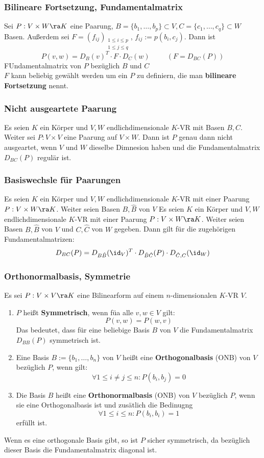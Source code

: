 \documentclass{kit}
\begin{document}
    \subsubsection{Bilineare Fortsetzung, Fundamentalmatrix}
      Sei $P:V\times W\ra K$ eine Paarung, $B=\{b_1,\dots,b_p\}\subset V,C=\{c_1,\dots,c_q\}\subset W$ Basen. Außerdem sei
      $F=(f_{ij})_{\substack{1\le i\le p\\1\le j\le q}}$, $f_{ij}:=p(b_i,c_j)$. Dann ist
      $$P(v,w)=D_B(v)^T\cdot F\cdot D_C(w)\hspace{1cm}(F=D_{BC}(P))$$
      FUndamentalmatrix von $P$ bezüglich $B$ und $C$\\
      $F$ kann beliebig gewählt werden um ein $P$ zu definiern, die man \textbf{bilineare Fortsetzung} nennt.
    \subsubsection{Nicht ausgeartete Paarung}
      Es seien $K$ ein Körper und $V,W$ endlichdimensionale $K$-VR mit Basen $B,C$. Weiter sei $P:V\times V$ eine Paarung
      auf $V\times W$. Dann ist $P$ genau dann nicht ausgeartet, wenn $V$ und $W$ dieselbe Dimnesion haben und die
      Fundamentalmatrix $D_{BC}(P)$ regulär ist.
    \subsubsection{Basiswechsle für Paarungen}
      Es seien $K$ ein Körper und $V,W$ endlichdimensionale $K$-VR mit einer Paarung $P:V\times W\ra K$. Weiter seien Basen
      $B,\hat{B}$ von $V$
      Es seien $K$ ein Körper und $V,W$ endlichdimensionale $K$-VR mit einer Paarung $P:V\times W\ra K$. Weiter seien 
      Basen $B,\hat{B}$ von $V$ und $C,\hat{C}$ von $W$ gegeben. Dann gilt für die zugehörigen Fundamentalmatrizen:
      $$D_{BC}(P)=D_{B\hat B}(\id_V)^T\cdot D_{\hat B\hat C}(P)\cdot D_{\hat C,C}(\id_W)$$
    \subsubsection{Orthonormalbasis, Symmetrie}
      Es sei $P:V\times V\ra K$ eine Bilinearform auf einem $n$-dimensionalen $K$-VR $V$.
      \begin{enumerate}
        \item $P$ heißt \textbf{Symmetrisch}, wenn füa alle $v,w\in V$ gilt:
          $$P(v,w)=P(w,v)$$
          Das bedeutet, dass für eine beliebige Basis $B$ von $V$ die Fundamentalmatrix $D_{BB}(P)$ symmetrisch ist.
        \item Eine Basis $B:=\{b_1,\dots,b_n\}$ von $V$ heißt eine \textbf{Orthogonalbasis} (ONB) von $V$ bezüglich $P$,
          wenn gilt:
          $$\forall1\le i\neq j\le n:P(b_i,b_j)=0$$
        \item Die Basis $B$ heißt eine \textbf{Orthonormalbasis} (ONB) von $V$ bezüglich $P$, wenn sie eine Orthogonalbasis
          ist und zusätlich die Bedinugng
          $$\forall1\le i\le n:P(b_i,b_i)=1$$
          erfüllt ist.
      \end{enumerate}
      Wenn es eine orthogonale Basis gibt, so ist $P$ sicher symmetrisch, da bezüglich dieser Basis die Fundamentalmatrix
      diagonal ist.
\end{document}
